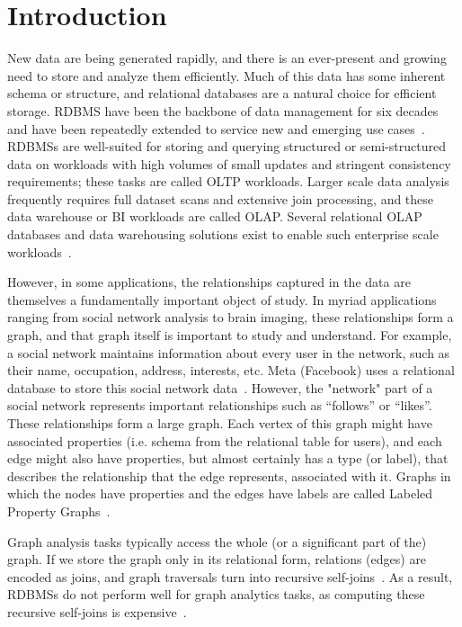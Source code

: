 \chapter{Introduction}
\label{introduction}
New data are being generated rapidly, and there is an ever-present and growing need to store and analyze them efficiently.
Much of this data has some inherent schema or structure, and relational databases are a natural choice for efficient storage.
\ac{RDBMS} have been the backbone of data management for six decades and have been repeatedly extended to service new and emerging use cases~\cite{stonebraker2018c,boncz2005monetdb, HStore2008Abadi, stonebraker2013voltdb,PASE2020:pgvector}.
RDBMSs are well-suited for storing and querying structured or semi-structured data on workloads with high volumes of small updates and stringent consistency requirements; these tasks are called \ac{OLTP} workloads.
Larger scale data analysis frequently requires full dataset scans and extensive join processing, and these data warehouse or \ac{BI} workloads are called \ac{OLAP}.
Several relational OLAP databases and data warehousing solutions exist to enable such enterprise scale workloads~\cite{Redshift2015,boncz2005monetdb,vertica, raasveldt2019duckdb}.

However, in some applications, the relationships captured in the data are themselves a fundamentally important object of study. 
In myriad applications ranging from social network analysis to brain imaging, these relationships form a graph, and that graph itself is important to study and understand.
For example, a social network maintains information about every user in the network, such as their name, occupation, address, interests, etc.
Meta (Facebook) uses a relational database to store this social network data~\cite{bronson2013tao}.
However, the "network" part of a social network represents important relationships such as ``follows'' or ``likes''.
These relationships form a large graph.
Each vertex of this graph might have associated properties (i.e. schema from the relational table for users), and each edge might also have properties, but almost certainly has a type (or label), that describes the relationship that the edge represents, associated with it.
Graphs in which the nodes have properties and the edges have labels are called Labeled Property Graphs~\cite{besta2020demystifying}.

Graph analysis tasks typically access the whole (or a significant part of the) graph.
If we store the graph only in its relational form, relations (edges) are encoded as joins, and graph traversals turn into recursive self-joins~\cite{10.1145/3129246}.
As a result, \ac{RDBMS}s do not perform well for graph analytics tasks, as computing these recursive self-joins is expensive~\cite{TransitiveClosureBiskupStiefeling1989}.

